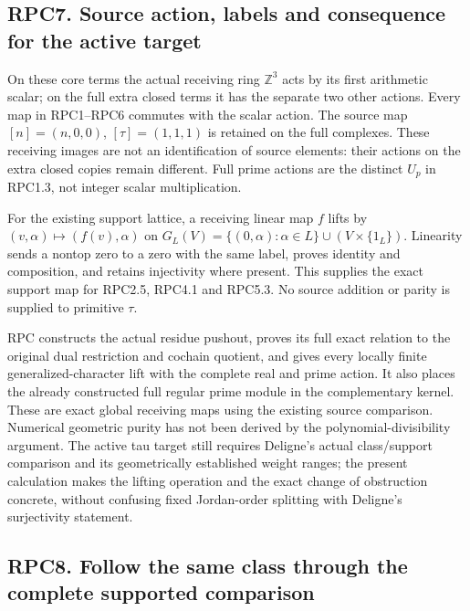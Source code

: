 \subsection{RPC7. Source action, labels and consequence for the active
target}\label{rpc7.-source-action-labels-and-consequence-for-the-active-target}

On these core terms the actual receiving ring \(\mathbb Z^3\) acts by
its first arithmetic scalar; on the full extra closed terms it has the
separate two other actions. Every map in RPC1--RPC6 commutes with the
scalar action. The source map \([n]=(n,0,0)\), \([\tau]=(1,1,1)\) is
retained on the full complexes. These receiving images are not an
identification of source elements: their actions on the extra closed
copies remain different. Full prime actions are the distinct \(U_p\) in
RPC1.3, not integer scalar multiplication.

For the existing support lattice, a receiving linear map \(f\) lifts by
\((v,\alpha)\mapsto(f(v),\alpha)\) on
\(G_L(V)=\{(0,\alpha):\alpha\in L\}\cup(V\times\{1_L\})\). Linearity
sends a nontop zero to a zero with the same label, proves identity and
composition, and retains injectivity where present. This supplies the
exact support map for RPC2.5, RPC4.1 and RPC5.3. No source addition or
parity is supplied to primitive \(\tau\).

RPC constructs the actual residue pushout, proves its full exact
relation to the original dual restriction and cochain quotient, and
gives every locally finite generalized-character lift with the complete
real and prime action. It also places the already constructed full
regular prime module in the complementary kernel. These are exact global
receiving maps using the existing source comparison. Numerical geometric
purity has not been derived by the polynomial-divisibility argument. The
active tau target still requires Deligne's actual class/support
comparison and its geometrically established weight ranges; the present
calculation makes the lifting operation and the exact change of
obstruction concrete, without confusing fixed Jordan-order splitting
with Deligne's surjectivity statement.

\subsection{RPC8. Follow the same class through the complete supported
comparison}\label{rpc8.-follow-the-same-class-through-the-complete-supported-comparison}

